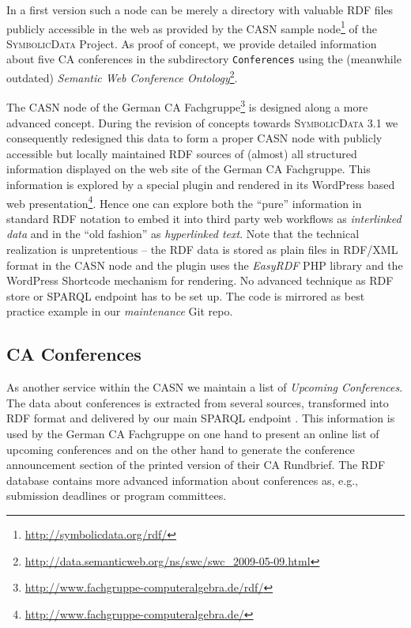\documentclass[a4paper,11pt]{article}
\def\SD{\textsc{SymbolicData}}
\begin{document}
In a first version such a node can be merely a directory with valuable RDF
files publicly accessible in the web as provided by the CASN sample
node\footnote{ \url{http://symbolicdata.org/rdf/}} of the {\SD} Project. As
proof of concept, we provide detailed
information about five CA conferences  in the subdirectory \texttt{Conferences} using the (meanwhile outdated)
\emph{Semantic Web Conference Ontology}\footnote{
  \url{http://data.semanticweb.org/ns/swc/swc_2009-05-09.html}}. 

The CASN node of the German CA Fachgruppe\footnote{
  \url{http://www.fachgruppe-computeralgebra.de/rdf/}} is designed along a more
advanced concept. During the revision of concepts towards {\SD} 3.1 we
consequently redesigned this data to form a proper CASN node with publicly
accessible but locally maintained RDF sources of (almost) all structured
information displayed on the web site of the German CA Fachgruppe.  This
information is explored by a special plugin and rendered in its WordPress based
web presentation\footnote{ \url{http://www.fachgruppe-computeralgebra.de/}}.
Hence one can explore both the ``pure'' information in standard RDF notation to
embed it into third party web workflows as \emph{interlinked data} and in the
``old fashion'' as \emph{hyperlinked text}.  Note that the technical
realization is unpretentious -- the RDF data is stored as plain files in
RDF/XML format in the CASN node and the plugin uses the \emph{EasyRDF} PHP
library and the WordPress Shortcode mechanism for rendering.  No advanced
technique as RDF store or SPARQL endpoint has to be set up.  The code is
mirrored as best practice example in our \emph{maintenance} Git repo.

\subsection{CA Conferences}

As another service within the CASN we maintain a list of \emph{Upcoming
  Conferences}.  The data about conferences is extracted from several sources,
transformed into RDF format and delivered by our main SPARQL endpoint
\cite{sdsparql}.  This information is used by the German CA Fachgruppe on one
hand to present an online list of upcoming conferences and on the
other hand to
generate the conference announcement section of the printed version of their CA
Rundbrief.  The RDF database contains more advanced information about
conferences as, e.g., submission deadlines or program committees.
\end{document}
